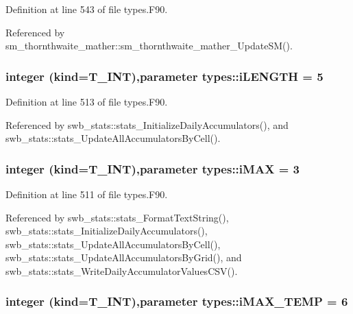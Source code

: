 Definition at line 543 of file types.F90.



Referenced by sm\_\-thornthwaite\_\-mather::sm\_\-thornthwaite\_\-mather\_\-UpdateSM().

\hypertarget{namespacetypes_a91d9c66c291dee92fc0284fa06fb6f73}{
\subsubsection[{iLENGTH}]{\setlength{\rightskip}{0pt plus 5cm}integer (kind={\bf T\_\-INT}),parameter {\bf types::iLENGTH} = 5}}
\label{namespacetypes_a91d9c66c291dee92fc0284fa06fb6f73}


Definition at line 513 of file types.F90.



Referenced by swb\_\-stats::stats\_\-InitializeDailyAccumulators(), and swb\_\-stats::stats\_\-UpdateAllAccumulatorsByCell().

\hypertarget{namespacetypes_a2f0945d479ed3cf3287563bd4acb0f85}{
\subsubsection[{iMAX}]{\setlength{\rightskip}{0pt plus 5cm}integer (kind={\bf T\_\-INT}),parameter {\bf types::iMAX} = 3}}
\label{namespacetypes_a2f0945d479ed3cf3287563bd4acb0f85}


Definition at line 511 of file types.F90.



Referenced by swb\_\-stats::stats\_\-FormatTextString(), swb\_\-stats::stats\_\-InitializeDailyAccumulators(), swb\_\-stats::stats\_\-UpdateAllAccumulatorsByCell(), swb\_\-stats::stats\_\-UpdateAllAccumulatorsByGrid(), and swb\_\-stats::stats\_\-WriteDailyAccumulatorValuesCSV().

\hypertarget{namespacetypes_a041c6ea18472c36d80d58d451635e4dc}{
\subsubsection[{iMAX\_\-TEMP}]{\setlength{\rightskip}{0pt plus 5cm}integer (kind={\bf T\_\-INT}),parameter {\bf types::iMAX\_\-TEMP} = 6}}
\label{namespacetypes_a041c6ea18472c36d80d58d451635e4dc}


